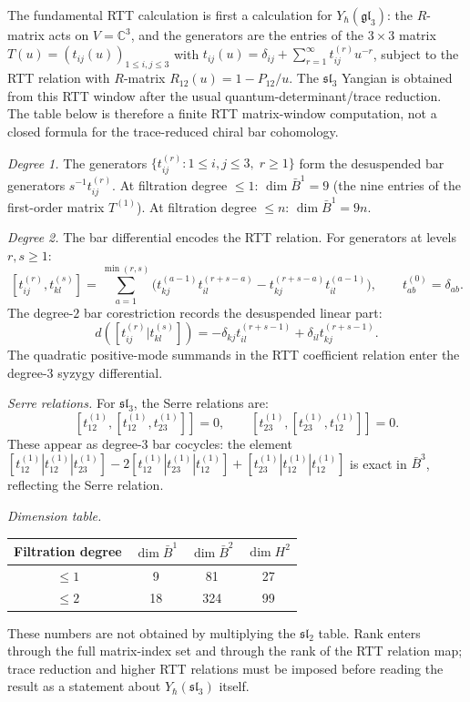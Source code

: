 \begin{computation}
\label{comp:yangian-sl3-bar}

The fundamental RTT calculation is first a calculation for
$Y_\hbar(\mathfrak{gl}_3)$: the $R$-matrix acts on
$V=\mathbb C^3$, and the generators are the entries of the
$3\times 3$ matrix
$T(u) = (t_{ij}(u))_{1 \leq i,j \leq 3}$ with
$t_{ij}(u) = \delta_{ij} + \sum_{r=1}^\infty t_{ij}^{(r)} u^{-r}$,
subject to the RTT relation with $R$-matrix
$R_{12}(u) = 1 - P_{12}/u$.
The $\mathfrak{sl}_3$ Yangian is obtained from this RTT window after
the usual quantum-determinant/trace reduction. The table below is
therefore a finite RTT matrix-window computation, not a closed formula
for the trace-reduced chiral bar cohomology.

\emph{Degree 1.}
The generators $\{t_{ij}^{(r)} : 1 \leq i,j \leq 3, \; r \geq 1\}$
form the desuspended bar generators $s^{-1}t_{ij}^{(r)}$.
At filtration degree $\leq 1$: $\dim \bar{B}^1 = 9$
(the nine entries of the first-order matrix $T^{(1)}$).
At filtration degree $\leq n$: $\dim \bar{B}^1 = 9n$.

\emph{Degree 2.}
The bar differential encodes the RTT relation.
For generators at levels $r, s \geq 1$:
\[
[t_{ij}^{(r)},t_{kl}^{(s)}]
=
\sum_{a=1}^{\min(r,s)}
\bigl(
t_{kj}^{(a-1)}t_{il}^{(r+s-a)}
-t_{kj}^{(r+s-a)}t_{il}^{(a-1)}
\bigr),
\qquad t_{ab}^{(0)}=\delta_{ab}.
\]
The degree-$2$ bar corestriction records the desuspended linear part:
\[
d([t_{ij}^{(r)} | t_{kl}^{(s)}])
=-\delta_{kj}t_{il}^{(r+s-1)}
 +\delta_{il}t_{kj}^{(r+s-1)}.
\]
The quadratic positive-mode summands in the RTT coefficient relation
enter the degree-$3$ syzygy differential.

\emph{Serre relations.}
For $\mathfrak{sl}_3$, the Serre relations are:
\[
[t_{12}^{(1)}, [t_{12}^{(1)}, t_{23}^{(1)}]] = 0, \qquad
[t_{23}^{(1)}, [t_{23}^{(1)}, t_{12}^{(1)}]] = 0.
\]
These appear as degree-3 bar cocycles: the element
$[t_{12}^{(1)} | t_{12}^{(1)} | t_{23}^{(1)}]
- 2[t_{12}^{(1)} | t_{23}^{(1)} | t_{12}^{(1)}]
+ [t_{23}^{(1)} | t_{12}^{(1)} | t_{12}^{(1)}]$
is exact in $\bar{B}^3$, reflecting the Serre relation.

\emph{Dimension table.}
\begin{center}
\renewcommand{\arraystretch}{1.2}
\begin{tabular}{c|ccc}
Filtration degree & $\dim \bar{B}^1$ & $\dim \bar{B}^2$ &
$\dim H^2$ \\
\hline
$\leq 1$ & 9 & 81 & 27 \\
$\leq 2$ & 18 & 324 & 99
\end{tabular}
\end{center}
These numbers are not obtained by multiplying the
$\mathfrak{sl}_2$ table. Rank enters through the full matrix-index
set and through the rank of the RTT relation map; trace reduction and
higher RTT relations must be imposed before reading the result as a
statement about $Y_\hbar(\mathfrak{sl}_3)$ itself.
\end{computation}

